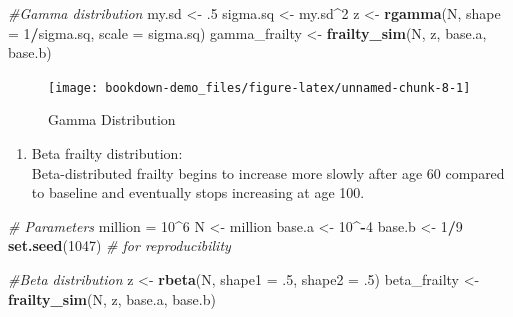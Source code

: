 \documentclass[]{book}
\newenvironment{Shaded}{\begin{snugshade}}{\end{snugshade}}
\newcommand{\CommentTok}[1]{\textcolor[rgb]{0.56,0.35,0.01}{\textit{#1}}}
\newcommand{\DataTypeTok}[1]{\textcolor[rgb]{0.13,0.29,0.53}{#1}}
\newcommand{\DecValTok}[1]{\textcolor[rgb]{0.00,0.00,0.81}{#1}}
\newcommand{\FloatTok}[1]{\textcolor[rgb]{0.00,0.00,0.81}{#1}}
\newcommand{\KeywordTok}[1]{\textcolor[rgb]{0.13,0.29,0.53}{\textbf{#1}}}
\newcommand{\NormalTok}[1]{#1}
\newcommand{\OperatorTok}[1]{\textcolor[rgb]{0.81,0.36,0.00}{\textbf{#1}}}
\newcommand{\StringTok}[1]{\textcolor[rgb]{0.31,0.60,0.02}{#1}}
\providecommand{\tightlist}{%
  \setlength{\itemsep}{0pt}\setlength{\parskip}{0pt}}
\begin{document}
\begin{enumerate}
\begin{Shaded}
\begin{Highlighting}[]
\CommentTok{#Gamma distribution}
\NormalTok{my.sd <-}\StringTok{ }\FloatTok{.5}
\NormalTok{ sigma.sq <-}\StringTok{ }\NormalTok{my.sd}\OperatorTok{^}\DecValTok{2}
\NormalTok{  z <-}\StringTok{ }\KeywordTok{rgamma}\NormalTok{(N, }\DataTypeTok{shape =} \DecValTok{1}\OperatorTok{/}\NormalTok{sigma.sq, }\DataTypeTok{scale =}\NormalTok{ sigma.sq)}
\NormalTok{gamma_frailty <-}\StringTok{ }\KeywordTok{frailty_sim}\NormalTok{(N, z, base.a, base.b)}
\end{Highlighting}
\end{Shaded}

  \begin{figure}
   \texttt{[image: bookdown-demo\_files/figure-latex/unnamed-chunk-8-1]} \caption{Gamma Distribution}\label{fig:unnamed-chunk-8}
   \end{figure}

  \begin{enumerate}
  \def\labelenumii{\alph{enumii}.}
  \setcounter{enumii}{2}
  \tightlist
  \item
    Beta frailty distribution:\\
    Beta-distributed frailty begins to increase more slowly after age 60 compared to baseline and eventually stops increasing at age 100.
  \end{enumerate}

\begin{Shaded}
\begin{Highlighting}[]
\CommentTok{# Parameters}
\NormalTok{million =}\StringTok{ }\DecValTok{10}\OperatorTok{^}\DecValTok{6}
\NormalTok{N <-}\StringTok{  }\NormalTok{million}
\NormalTok{base.a <-}\StringTok{ }\DecValTok{10}\OperatorTok{^-}\DecValTok{4}
\NormalTok{base.b <-}\StringTok{ }\DecValTok{1}\OperatorTok{/}\DecValTok{9}
\KeywordTok{set.seed}\NormalTok{(}\DecValTok{1047}\NormalTok{) }\CommentTok{# for reproducibility}

\CommentTok{#Beta distribution}
\NormalTok{z <-}\StringTok{ }\KeywordTok{rbeta}\NormalTok{(N, }\DataTypeTok{shape1 =} \FloatTok{.5}\NormalTok{, }\DataTypeTok{shape2 =} \FloatTok{.5}\NormalTok{)}
\NormalTok{beta_frailty <-}\StringTok{ }\KeywordTok{frailty_sim}\NormalTok{(N, z, base.a, base.b)}
\end{Highlighting}
\end{Shaded}


\end{enumerate}
\end{document}
